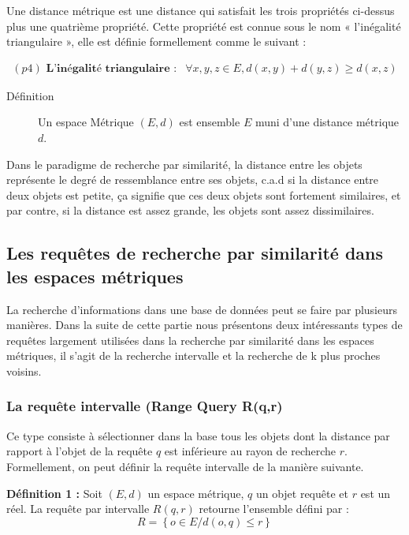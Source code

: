 Une distance métrique est une distance qui satisfait les trois propriétés ci-dessus plus une quatrième propriété. Cette propriété est connue sous le nom « l’inégalité triangulaire », elle est définie formellement comme le suivant :

\begin{equation}
\begin{array}{cc}
(p4)\textbf{ L’inégalité triangulaire :}  & \forall x,y,z\in E, d(x,y)+d(y,z) \geq d(x,z)
\end{array}
\end{equation}

\begin{description}
	\item[Définition] Un espace Métrique $ (E,d) $ est ensemble $ E $ muni d’une distance métrique $ d $.
\end{description}

Dans le paradigme de recherche par similarité, la distance entre les objets représente le degré de ressemblance entre ses objets, c.a.d si la distance entre deux objets est petite, ça signifie que ces deux objets sont fortement similaires, et par contre, si la distance est assez
grande, les objets sont assez dissimilaires.

\subsection{Les requêtes de recherche par similarité dans les espaces métriques}
La recherche d’informations dans une base de données peut se faire par plusieurs manières. Dans la suite de cette partie nous présentons deux intéressants types de requêtes largement utilisées dans la recherche par similarité dans les espaces métriques, il s’agit de la recherche intervalle et la recherche de k plus proches voisins.

\subsubsection{La requête intervalle (Range Query R(q,r)}
Ce type consiste à sélectionner dans la base tous les objets dont la
distance par rapport à l’objet de la requête $ q $ est inférieure au rayon de recherche $ r $. Formellement, on peut définir la requête intervalle de la manière suivante.

\textbf{Définition 1 :} Soit $ (E,d ) $ un espace métrique, $ q $ un objet requête et $ r $ est un réel. La requête par intervalle $ R(q,r) $ retourne l’ensemble défini par :
\begin{equation}
	R = \left\{ o\in E / d(o, q) \leq r \right\}
\end{equation}

